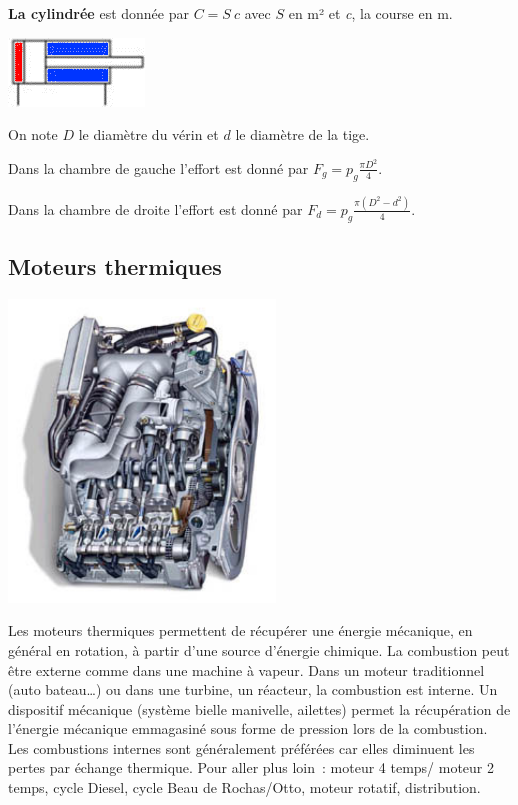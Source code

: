 \textbf{La cylindrée} est donnée par \(C = S\ c\) avec \(S\) en m² et
\emph{c}, la course en m.


\begin{center}
\includegraphics[width=1.42708in,height=0.71875in]{media/image83.png}
\end{center}

On note $D$ le diamètre du vérin et $d$ le diamètre de la tige.

Dans la chambre de gauche l'effort est donné par
\(F_{g} = p_{g}\frac{\pi D^{2}}{4}\).

Dans la chambre de droite l'effort est donné par
\(F_{d} = p_{g}\frac{\pi\left( D^{2} - d^{2} \right)}{4}\). \\


\subsection{Moteurs thermiques}

\begin{center}
\includegraphics[width=2.79532in,height=3.1643in]{media/image84.jpeg} 
\end{center}

Les moteurs thermiques permettent de récupérer une énergie mécanique, en
général en rotation, à partir d'une source d'énergie chimique. La
combustion peut être externe comme dans une machine à vapeur. Dans un
moteur traditionnel (auto bateau\ldots) ou dans une turbine, un
réacteur, la combustion est interne. Un dispositif mécanique (système
bielle manivelle, ailettes) permet la récupération de l'énergie
mécanique emmagasiné sous forme de pression lors de la combustion. Les
combustions internes sont généralement préférées car elles diminuent les
pertes par échange thermique. Pour aller plus loin~: moteur 4 temps/
moteur 2 temps, cycle Diesel, cycle Beau de Rochas/Otto, moteur rotatif,
distribution.